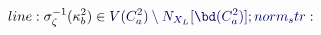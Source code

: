 \documentclass[12pt]{article}
\begin{document}
\makeatletter
\renewcommand*{\@textcolor}[3]{%
  \protect\leavevmode
  \begingroup
    \color#1{#2}#3%
  \endgroup
}
\makeatother
\begin{displaymath}
\mathcolor[RGB]{0,0,15}{line:
\sigma_\zeta^{-1}(\kappa_b^2)} \mathcolor[RGB]{0,0,30}{\in} \mathcolor[RGB]{0,0,45}{V(\mathcal} \mathcolor[RGB]{0,0,60}{C_a^2)} \mathcolor[RGB]{0,0,75}{\setminus} \mathcolor[RGB]{0,0,90}{N_{X_L}[\bd(\mathcal} \mathcolor[RGB]{0,0,105}{C_a^2)];

norm_str:}
\end{displaymath}
\end{document}
